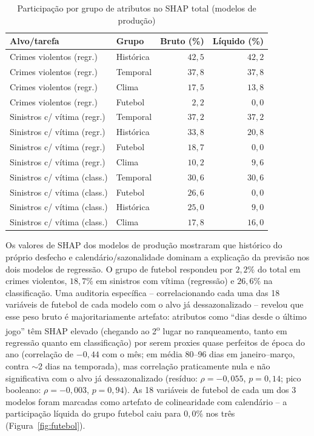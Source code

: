 \documentclass[12pt]{article}
\begin{document}
\begin{table}[ht]
\centering
\caption{Participação por grupo de atributos no SHAP total (modelos de
produção)}
\label{tab:shap-grupos}
\small
\begin{tabular}{@{}llrr@{}}
\toprule
\textbf{Alvo/tarefa} & \textbf{Grupo} & \textbf{Bruto (\%)} & \textbf{Líquido (\%)} \\
\midrule
Crimes violentos (regr.)      & Histórica & $42,5$ & $42,2$ \\
Crimes violentos (regr.)      & Temporal  & $37,8$ & $37,8$ \\
Crimes violentos (regr.)      & Clima     & $17,5$ & $13,8$ \\
Crimes violentos (regr.)      & Futebol   & $2,2$  & $0,0$  \\
\midrule
Sinistros c/ vítima (regr.)   & Temporal  & $37,2$ & $37,2$ \\
Sinistros c/ vítima (regr.)   & Histórica & $33,8$ & $20,8$ \\
Sinistros c/ vítima (regr.)   & Futebol   & $18,7$ & $0,0$  \\
Sinistros c/ vítima (regr.)   & Clima     & $10,2$ & $9,6$  \\
\midrule
Sinistros c/ vítima (class.)  & Temporal  & $30,6$ & $30,6$ \\
Sinistros c/ vítima (class.)  & Futebol   & $26,6$ & $0,0$  \\
Sinistros c/ vítima (class.)  & Histórica & $25,0$ & $9,0$  \\
Sinistros c/ vítima (class.)  & Clima     & $17,8$ & $16,0$ \\
\bottomrule
\end{tabular}
\end{table}

Os valores de SHAP dos modelos de produção mostraram que histórico do
próprio desfecho e calendário/sazonalidade dominam a explicação da
previsão nos dois modelos de regressão. O grupo de futebol respondeu por
$2,2\%$ do total em crimes violentos, $18,7\%$ em sinistros com vítima
(regressão) e $26,6\%$ na classificação. Uma auditoria específica --
correlacionando cada uma das 18 variáveis de futebol de cada modelo com o
alvo já dessazonalizado -- revelou que esse peso bruto é majoritariamente
artefato: atributos como ``dias desde o último jogo'' têm SHAP elevado
(chegando ao 2\textsuperscript{o} lugar no ranqueamento, tanto em
regressão quanto em classificação) por serem proxies quase perfeitos de
época do ano (correlação de $-0,44$ com o mês; em média 80--96 dias em
janeiro--março, contra $\sim$2 dias na temporada), mas correlação
praticamente nula e não significativa com o alvo já dessazonalizado
(resíduo: $\rho=-0,055$, $p=0,14$; pico booleano: $\rho=-0,003$,
$p=0,94$). As 18 variáveis de futebol de cada um dos 3 modelos foram
marcadas como artefato de colinearidade com calendário -- a participação
líquida do grupo futebol caiu para $0,0\%$ nos três
(Figura~\ref{fig:futebol}).
\end{document}
